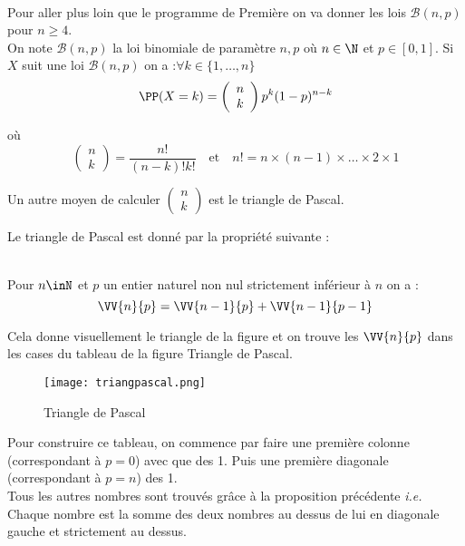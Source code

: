 \documentclass[12pt,fleqn]{report} %
\begin{document}
\begin{example}\text{ }\\
	Pour aller plus loin que le programme de Première on va donner les lois $\mathcal{B}(n,p)$ pour $n\geq 4$.\\
	On note $\mathcal{B}(n,p)$ la loi binomiale de paramètre $n,p$ où $n \in \N$ et $p \in [0,1]$.
	Si $X$ suit une loi $\mathcal{B}(n,p)$ on a :$\forall k \in \lbrace 1,\dots ,n \rbrace$
	\[
	\PP(X = k) = \left( \begin{array}{c}
	n \\
	k 
	\end{array}\right) p^k (1-p)^{n-k}
	\]
	
	où \[ \left( \begin{array}{c}
	n \\
	k \end{array}\right)  = \frac{n!}{(n-k)! k!} \quad \text{et} \quad n! = n \times (n-1) \times \dots \times 2 \times 1\]
	
	Un autre moyen de calculer $ \left( \begin{array}{c}
	n \\
	k 
	\end{array}\right)$ est le triangle de Pascal.
	
	Le triangle de Pascal est donné par la propriété suivante : 
	\begin{proposition}\text{ }\\
		Pour $n\inN$ et $p$ un entier naturel non nul strictement inférieur à $n$ on a :
		\[
		\VV{n}{p} = \VV{n-1}{p} + \VV{n-1}{p-1}
		\]
		
	\end{proposition}
	
	Cela donne visuellement le triangle de la figure et on trouve les $\VV{n}{p}$ dans les cases du tableau de la figure Triangle de Pascal.  
	
	\begin{figure}[h!]\label{Figure Triangle de Pascal}
		\begin{center}
			\texttt{[image: triangpascal.png]}
			\caption{Triangle de Pascal}
		\end{center}
	\end{figure}
	
	
	Pour construire ce tableau, on commence par faire une première colonne (correspondant à $p=0$) avec que des 1. Puis une première diagonale (correspondant à $p = n$) des 1. \\
	Tous les autres nombres sont trouvés grâce à la proposition précédente \emph{i.e.} Chaque nombre est la somme des deux nombres au dessus de lui en diagonale gauche et strictement au dessus. 
	

\end{example}
\end{document}
